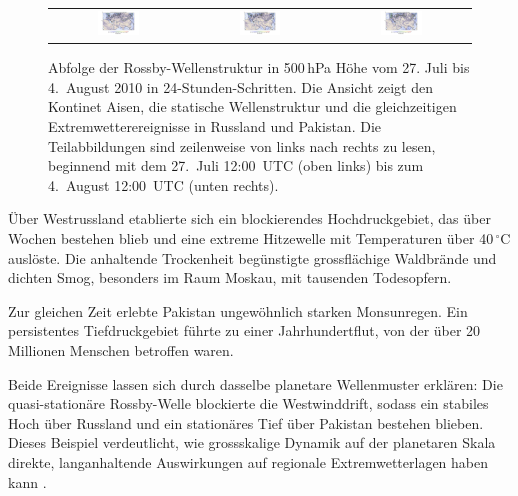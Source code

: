 \begin{figure}
\begin{tabular}{ccc}
		\includegraphics[width=0.32\textwidth, trim=3cm 3cm 3cm 1.1cm, clip]{papers/rossby/images/data_2010_8_2_12_00_500.jpg}  &
		\includegraphics[width=0.32\textwidth, trim=3cm 3cm 3cm 1.1cm, clip]{papers/rossby/images/data_2010_8_3_12_00_500.jpg}  &
		\includegraphics[width=0.32\textwidth, trim=3cm 3cm 3cm 1.1cm, clip]{papers/rossby/images/data_2010_8_4_12_00_500.jpg}    \\
	\end{tabular}
	\caption{Abfolge der Rossby-Wellenstruktur in 500\,hPa Höhe vom 27. Juli bis 4.\ August 2010 in 24-Stunden-Schritten.
		Die Ansicht zeigt den Kontinet Aisen, die statische Wellenstruktur und die
		gleichzeitigen Extremwetterereignisse in Russland und Pakistan.
		Die Teilabbildungen sind zeilenweise von links nach rechts zu lesen, beginnend mit dem 27.\ Juli 12:00~UTC (oben links)
		bis zum 4.\ August 12:00~UTC (unten rechts).}
	\label{fig:rossby_grid_2010}
\end{figure}


Über Westrussland etablierte sich ein blockierendes Hochdruckgebiet, das über Wochen bestehen blieb und eine extreme Hitzewelle mit Temperaturen über 40\,$^\circ$C auslöste.
Die anhaltende Trockenheit begünstigte grossflächige Waldbrände und dichten Smog, besonders im Raum Moskau, mit tausenden Todesopfern.

Zur gleichen Zeit erlebte Pakistan ungewöhnlich starken Monsunregen. Ein
persistentes Tiefdruckgebiet führte zu einer Jahrhundertflut, von der über 20
Millionen Menschen betroffen waren.

Beide Ereignisse lassen sich durch dasselbe planetare Wellenmuster erklären:
Die quasi-stationäre Rossby-Welle blockierte die Westwinddrift, sodass ein
stabiles Hoch über Russland und ein stationäres Tief über Pakistan bestehen
blieben. Dieses Beispiel verdeutlicht, wie grossskalige Dynamik auf der
planetaren Skala direkte, langanhaltende Auswirkungen auf regionale
Extremwetterlagen haben kann \cite{rossby:petoukhov2013}.
